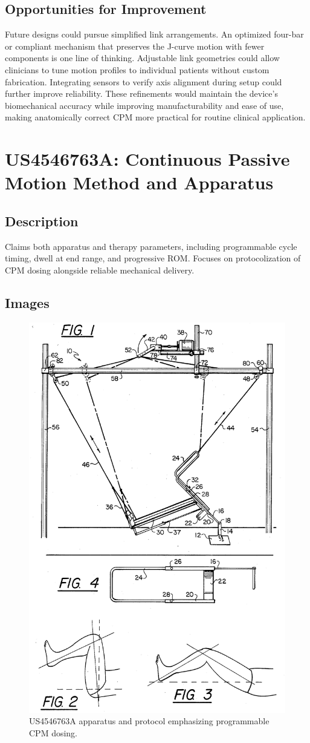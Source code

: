 \documentclass[11pt]{article}
\begin{document}
\subsection{Opportunities for Improvement}
Future designs could pursue simplified link arrangements. An optimized four-bar or compliant mechanism that preserves the J-curve motion with fewer components is one line of thinking. Adjustable link geometries could allow clinicians to tune motion profiles to individual patients without custom fabrication. Integrating sensors to verify axis alignment during setup could further improve reliability. These refinements would maintain the device's biomechanical accuracy while improving manufacturability and ease of use, making anatomically correct CPM more practical for routine clinical application.

\section{US4546763A: Continuous Passive Motion Method and Apparatus}
\subsection{Description}
Claims both apparatus and therapy parameters, including programmable cycle timing, dwell at end range, and progressive ROM. Focuses on protocolization of CPM dosing alongside reliable mechanical delivery.
\subsection{Images}
\begin{figure}[H]
  \centering
  \includegraphics[width=0.54\linewidth]{US4546763-drawings-page-2.png}
  \caption{US4546763A apparatus and protocol emphasizing programmable CPM dosing.}
  \label{fig:US4546763A}
\end{figure}
\end{document}
